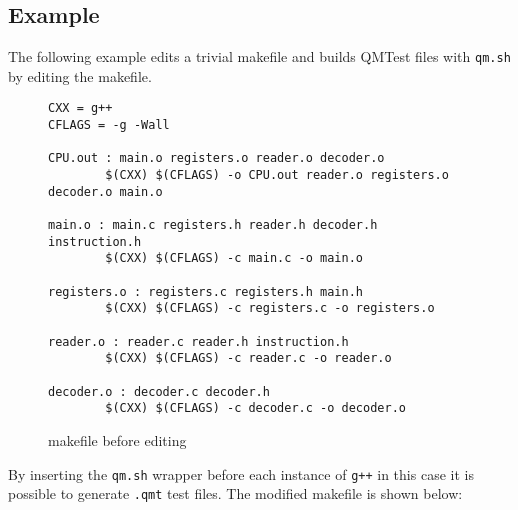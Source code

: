 \subsection{Example}

The following example edits a trivial makefile and builds QMTest files with
{\tt qm.sh} by editing the makefile.

\begin{figure}[!ht]
{\scriptsize
\begin{verbatim}
CXX = g++
CFLAGS = -g -Wall

CPU.out : main.o registers.o reader.o decoder.o
        $(CXX) $(CFLAGS) -o CPU.out reader.o registers.o decoder.o main.o
                                                                                
main.o : main.c registers.h reader.h decoder.h instruction.h
        $(CXX) $(CFLAGS) -c main.c -o main.o
                                                                                
registers.o : registers.c registers.h main.h
        $(CXX) $(CFLAGS) -c registers.c -o registers.o
                                                                                
reader.o : reader.c reader.h instruction.h
        $(CXX) $(CFLAGS) -c reader.c -o reader.o
                                                                                
decoder.o : decoder.c decoder.h
        $(CXX) $(CFLAGS) -c decoder.c -o decoder.o
\end{verbatim}
}
\caption{makefile before editing}
\end{figure}
By inserting the {\tt qm.sh} wrapper before each instance of {\tt g++} in this
case it is possible to generate {\tt .qmt} test files. The modified makefile is
shown below:


